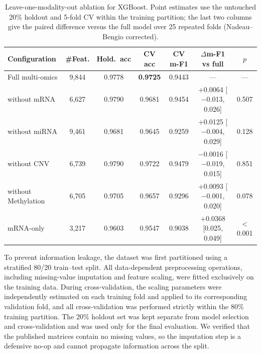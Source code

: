 \begin{table}[htbp]
\caption{Leave-one-modality-out ablation for XGBoost. Point estimates use the
untouched 20\% holdout and 5-fold CV within the training partition; the last two
columns give the paired difference versus the full model over 25 repeated folds
(Nadeau--Bengio corrected).}
\label{tab:ablation}
\centering
\footnotesize
\begin{tabular}{lcccccc}
\toprule
Configuration & \#Feat. & Hold.\ acc & CV acc & CV m-F1 & $\Delta$m-F1 vs full & $p$ \\
\midrule
Full multi-omics      & 9{,}844 & 0.9778 & \textbf{0.9725} & 0.9443 & --- & --- \\
without mRNA          & 6{,}627 & 0.9790 & 0.9681 & 0.9454 & +0.0064 [$-$0.013, 0.026] & 0.507 \\
without miRNA         & 9{,}461 & 0.9681 & 0.9645 & 0.9259 & +0.0125 [$-$0.004, 0.029] & 0.128 \\
without CNV           & 6{,}739 & 0.9790 & 0.9722 & 0.9479 & $-$0.0016 [$-$0.019, 0.015] & 0.851 \\
without Methylation   & 6{,}705 & 0.9705 & 0.9657 & 0.9296 & +0.0093 [$-$0.001, 0.020] & 0.078 \\
mRNA-only             & 3{,}217 & 0.9603 & 0.9547 & 0.9038 & +0.0368 [0.025, 0.049] & $<$0.001 \\
\bottomrule
\end{tabular}
\end{table}


To prevent information leakage, the dataset was first partitioned using a
stratified 80/20 train--test split. All data-dependent preprocessing
operations, including missing-value imputation and feature scaling, were fitted
exclusively on the training data. During cross-validation, the scaling
parameters were independently estimated on each training fold and applied to
its corresponding validation fold, and all cross-validation was performed
strictly within the 80\% training partition. The 20\% holdout set was kept
separate from model selection and cross-validation and was used only for the
final evaluation. We verified that the published matrices contain no missing
values, so the imputation step is a defensive no-op and cannot propagate
information across the split.


